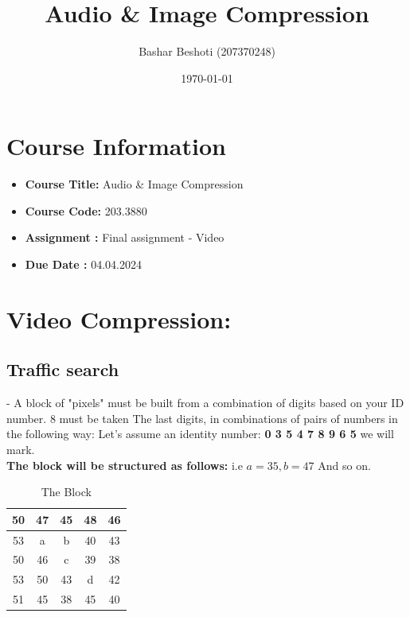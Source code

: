 \documentclass[letterpaper, 12pt]{article}
\title{Audio \& Image Compression}
\author{Bashar Beshoti (207370248)
}
\date{\today}
\begin{document}
\maketitle

\section*{Course Information}
\begin{itemize}
    \item \textbf{Course Title:} Audio \& Image Compression  %
    \item \textbf{Course Code:} 203.3880
    \item \textbf{Assignment :} Final assignment - Video
    \item     \textbf{Due Date : } 04.04.2024

\end{itemize}




\newpage

\section{Video Compression:}

\subsection{Traffic search} - A block of "pixels" must be built from a combination of digits based on your ID number. 8 must be taken
The last digits, in combinations of pairs of numbers in the following way:
Let's assume an identity number: \textbf{0 3 5 4 7 8 9 6 5} we will mark.\\

\textbf{The block will be structured as follows:}
i.e $a=35, b=47$ And so on.\\


\begin{table}[htbp]
    \centering
\caption{The Block}    \begin{tabular}{|c|c|c|c|c|} \hline 
         50&  47&  45&  48& 46\\ \hline 
         53&  a&  b&  40& 43\\ \hline 
         50&  46&  c&  39& 38\\ \hline 
         53&  50&  43&  d& 42\\ \hline 
         51&  45&  38&  45& 40\\ \hline
    \end{tabular}
    
    
\end{table}
\end{document}

